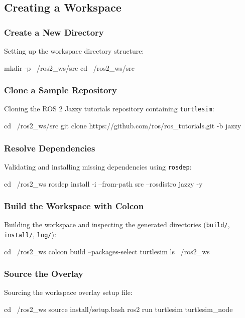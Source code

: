 \documentclass[11pt,a4paper]{article}
\begin{document}
\subsection{Creating a Workspace}

\subsubsection{Create a New Directory}
Setting up the workspace directory structure:
\begin{cmdbox}
mkdir -p ~/ros2_ws/src
cd ~/ros2_ws/src
\end{cmdbox}

\subsubsection{Clone a Sample Repository}
Cloning the ROS 2 Jazzy tutorials repository containing \texttt{turtlesim}:
\begin{cmdbox}
cd ~/ros2_ws/src
git clone https://github.com/ros/ros_tutorials.git -b jazzy
\end{cmdbox}

\subsubsection{Resolve Dependencies}
Validating and installing missing dependencies using \texttt{rosdep}:
\begin{cmdbox}
cd ~/ros2_ws
rosdep install -i --from-path src --rosdistro jazzy -y
\end{cmdbox}

\clearpage
\subsubsection{Build the Workspace with Colcon}
Building the workspace and inspecting the generated directories (\texttt{build/}, \texttt{install/}, \texttt{log/}):
\begin{cmdbox}
cd ~/ros2_ws
colcon build --packages-select turtlesim
ls ~/ros2_ws
\end{cmdbox}

\subsubsection{Source the Overlay}
Sourcing the workspace overlay setup file:
\begin{cmdbox}
cd ~/ros2_ws
source install/setup.bash
ros2 run turtlesim turtlesim_node
\end{cmdbox}
\end{document}
